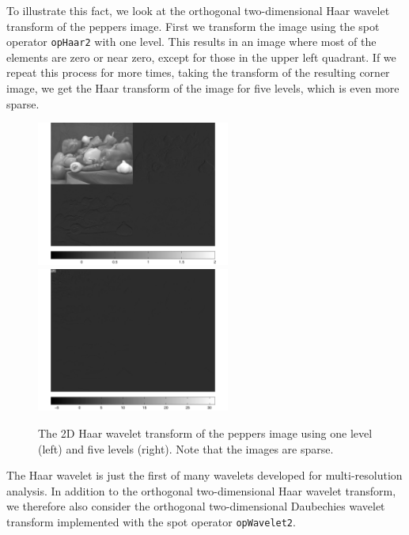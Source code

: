 \documentclass[10pt,a4paper]{article}
\begin{document}
	To illustrate this fact, we look at the orthogonal two-dimensional Haar wavelet transform of the peppers image. First we transform the image using the spot operator {\tt opHaar2} with one level. This results in an image where most of the elements are zero or near zero, except for those in the upper left quadrant. If we repeat this process for more times, taking the transform of the resulting corner image, we get the Haar transform of the image for five levels, which is even more sparse. 
	
	\begin{figure}[H]
		\centering
		\includegraphics[width=2.5in]{../figures/haarTrans2} \quad
		\includegraphics[width=2.5in]{../figures/haarTrans3}
		\caption{The 2D Haar wavelet transform of the peppers image using one level (left) and five levels (right). Note that the images are sparse. }
	\end{figure}
	
	The Haar wavelet is just the first of many wavelets developed for multi-resolution analysis. In addition to the orthogonal two-dimensional Haar wavelet transform, we therefore also consider the orthogonal two-dimensional Daubechies wavelet transform implemented with the spot operator {\tt opWavelet2}. 
	
\end{document}
